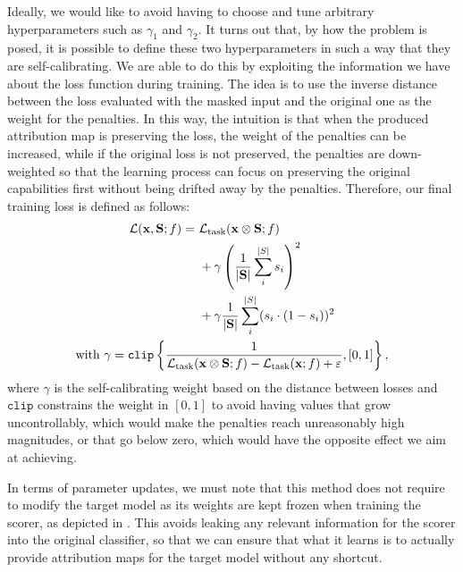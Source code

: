 Ideally, we would like to avoid having to choose and tune arbitrary hyperparameters such as $\gamma_1$ and $\gamma_2$. It turns out that, by how the problem is posed, it is possible to define these two hyperparameters in such a way that they are self-calibrating. We are able to do this by exploiting the information we have about the loss function during training. The idea is to use the inverse distance between the loss evaluated with the masked input and the original one as the weight for the penalties. In this way, the intuition is that when the produced attribution map is preserving the loss, the weight of the penalties can be increased, while if the original loss is not preserved, the penalties are down-weighted so that the learning process can focus on preserving the original capabilities first without being drifted away by the penalties. Therefore, our final training loss is defined as follows:
\begin{equation}
    \label{eq:loss}
    \begin{gathered}
        \begin{aligned}
            {\ensuremath{\mathcal{L}}}({\mathbf{x}}, {\mathbf{S}}; f) =\,\, &{\mathcal{L}}_\text{task}({\mathbf{x}} \otimes {\ensuremath{\mathbf{S}}}; f) \\
            &+ \gamma \left( \frac{1}{\vert {\ensuremath{\mathbf{S}}} \vert} \sum_i^{\vert S \vert} s_i \right)^2 \\
            &+ \gamma \frac{1}{\vert {\ensuremath{\mathbf{S}}} \vert} \sum_i^{\vert S \vert} (s_i \cdot (1-s_i))^2 \\
        \end{aligned} \\
        \text{with } \gamma = \texttt{clip}\left\{ \frac{1}{{\mathcal{L}}_\text{task}({\mathbf{x}} \otimes {\ensuremath{\mathbf{S}}}; f) - {\mathcal{L}}_\text{task}({\mathbf{x}}; f) + \varepsilon}, [0, 1] \right\},
    \end{gathered}
\end{equation}
where $\gamma$ is the self-calibrating weight based on the distance between losses and $\texttt{clip}$ constrains the weight in $[0, 1]$ to avoid having values that grow uncontrollably, which would make the penalties reach unreasonably high magnitudes, or that go below zero, which would have the opposite effect we aim at achieving.

In terms of parameter updates, we must note that this method does not require to modify the target model as its weights are kept frozen when training the scorer, as depicted in . This avoids leaking any relevant information for the scorer into the original classifier, so that we can ensure that what it learns is to actually provide attribution maps for the target model without any shortcut. 

